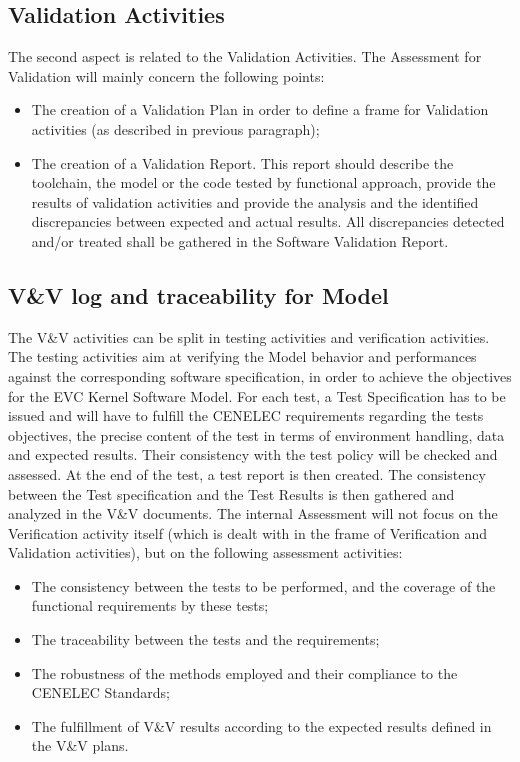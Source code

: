 \documentclass[openetcs]{template/openetcs_article}
\begin{document}
\subsection{Validation Activities}
The second aspect is related to the Validation Activities. The Assessment for Validation will mainly concern the following points:
\begin{itemize}
\item The creation of a Validation Plan in order to define a frame for Validation activities (as described in previous paragraph);
\item The creation of a Validation Report. This report should describe the toolchain, the model or the code tested by functional approach, provide the results
of validation activities and provide the analysis and the identified discrepancies between expected and actual results. All discrepancies detected and/or
treated shall be gathered in the Software Validation Report.
\end{itemize}

\subsection{V\&V log and traceability for Model}
The V\&V activities can be split in testing activities and verification activities. The testing activities aim at verifying the Model behavior and performances
against the corresponding software specification, in order to achieve the objectives for the EVC Kernel Software Model.
For each test, a Test Specification has to be issued and will have to fulfill the CENELEC requirements regarding the tests objectives, the precise content of
the test in terms of environment handling, data and expected results. Their consistency with the test policy will be checked and assessed. At the end of the
test, a test report is then created. The consistency between the Test specification and the Test Results is then gathered and analyzed in the V\&V documents.
The internal Assessment will not focus on the Verification activity itself (which is dealt with in the frame of Verification and Validation activities), but on
the following assessment activities:
\begin{itemize}
\item The consistency between the tests to be performed, and the coverage of the functional requirements by these tests;
\item The traceability between the tests and the requirements;
\item The robustness of the  methods employed and their compliance to the CENELEC Standards;
\item The fulfillment of V\&V results according to the expected results defined in the V\&V plans.
\end{itemize}
\end{document}
